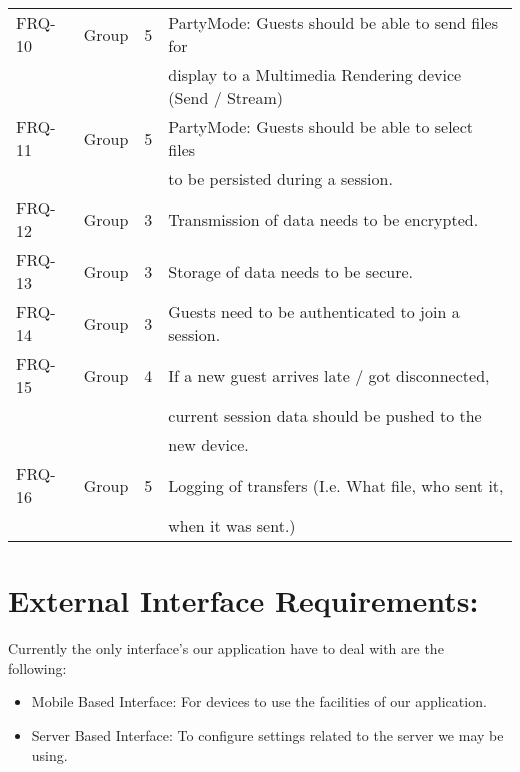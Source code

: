\documentclass[12pt]{article}
\begin{document}
\begin{center}
\begin{tabular}[h]{|l|l|l|l|}
\hline
FRQ-10 & Group & 5 & PartyMode: Guests should be able to send files for \\ & & & 
					display to a Multimedia Rendering device (Send / Stream)\\
\hline
FRQ-11 & Group & 5 & PartyMode: Guests should be able to select files\\ & & & 
					 to be persisted during a session.\\
\hline
FRQ-12 & Group & 3 & Transmission of data needs to be encrypted.\\
\hline
FRQ-13 & Group & 3 & Storage of data needs to be secure.\\
\hline
FRQ-14 & Group & 3 & Guests need to be authenticated to join a session.\\
\hline
FRQ-15 & Group & 4 & If a new guest arrives late / got disconnected,\\ & & & 
					 current session data should be pushed to the \\ & & & 
					 new device.\\
\hline
FRQ-16 & Group & 5 & Logging of transfers (I.e. What file, who sent it,\\ & & & 
					 when it was sent.)\\
\hline



\end{tabular} \end{center}

\section{External Interface Requirements:}
Currently the only interface's our application have to deal with are the
\\following:
\begin{itemize}
\item Mobile Based Interface: For devices to use the facilities of our application.
\item Server Based Interface: To configure settings related to the server we may be using.
\end{itemize}
\end{document}
